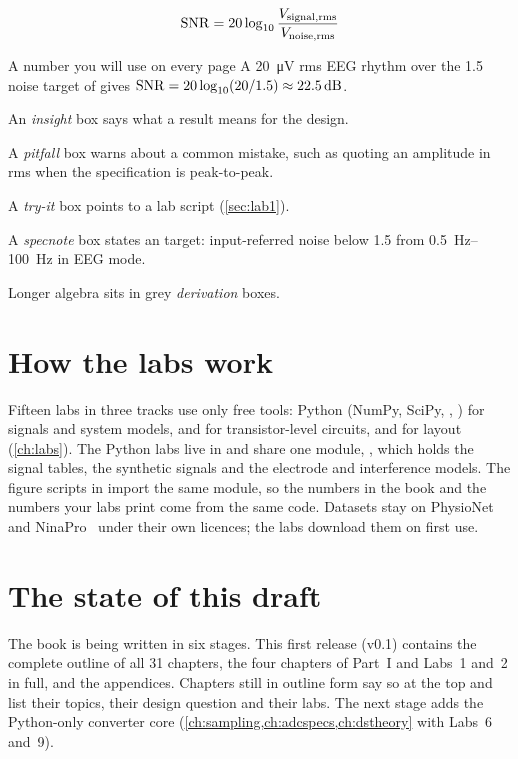 {\renewcommand{\thewexample}{P.1}%
\begin{keyeq}
\[ \mathrm{SNR} = 20\log_{10}\frac{V_\mathrm{signal,rms}}{V_\mathrm{noise,rms}} \]
\end{keyeq}
\begin{example}{A number you will use on every page}
A \qty{20}{\micro\volt} rms EEG rhythm over the \qty{1.5}{\uVrms} noise target of \OB{} gives $\SNR = 20\log_{10}(20/1.5) \approx \qty{22.5}{\deci\bel}$.
\end{example}}
\setcounter{wexample}{0}
\begin{insight}
An \emph{insight} box says what a result means for the \OB{} design.
\end{insight}
\begin{pitfall}
A \emph{pitfall} box warns about a common mistake, such as quoting an amplitude in rms when the specification is peak-to-peak.
\end{pitfall}
\begin{tryit}
A \emph{try-it} box points to a lab script (\cref{sec:lab1}).
\end{tryit}
\begin{specnote}
A \emph{specnote} box states an \OB{} target: input-referred noise below \qty{1.5}{\uVrms} from \qtyrange{0.5}{100}{\hertz} in EEG mode.
\end{specnote}
Longer algebra sits in grey \emph{derivation} boxes.

\section*{How the labs work}
Fifteen labs in three tracks use only free tools: Python (NumPy, SciPy, , ) for signals and system models,  and  for transistor-level \sgx{} circuits, and  for layout (\cref{ch:labs}). The Python labs live in  and share one module, , which holds the signal tables, the synthetic signals and the electrode and interference models. The figure scripts in  import the same module, so the numbers in the book and the numbers your labs print come from the same code. Datasets stay on PhysioNet~\cite{physionet} and NinaPro~\cite{ninapro} under their own licences; the labs download them on first use.

\section*{The state of this draft}
The book is being written in six stages. This first release (v0.1) contains the complete outline of all 31 chapters, the four chapters of Part~I and Labs~1 and~2 in full, and the appendices. Chapters still in outline form say so at the top and list their topics, their design question and their labs. The next stage adds the Python-only converter core (\cref{ch:sampling,ch:adcspecs,ch:dstheory} with Labs~6 and~9).

